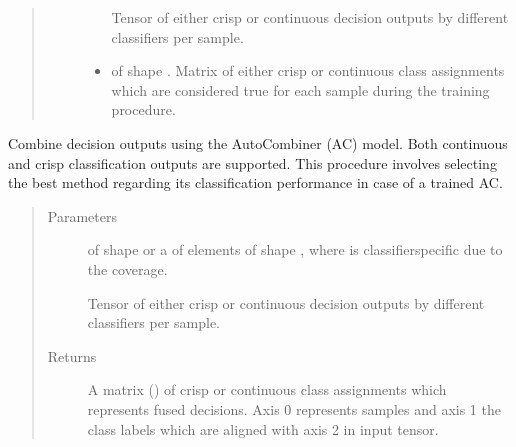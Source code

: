 \documentclass[letterpaper,10pt,english]{sphinxmanual}
\begin{document}
\begin{fulllineitems}
\begin{fulllineitems}
\begin{quote}
\begin{description}
\begin{itemize}
\sphinxAtStartPar
Tensor of either crisp or continuous decision outputs by different classifiers per sample.


\item {} 
\sphinxAtStartPar
{} \textendash{}  of shape .
Matrix of either crisp or continuous class assignments which are considered true for each sample during
the training procedure.

\end{itemize}

\end{description}\end{quote}

\end{fulllineitems}


\begin{fulllineitems}
\label{\detokenize{pusion.auto.auto_combiner:pusion.auto.auto_combiner.AutoCombiner.combine}}
\sphinxAtStartPar
Combine decision outputs using the AutoCombiner (AC) model. Both continuous and crisp classification outputs are
supported. This procedure involves selecting the best method regarding its classification performance in case
of a trained AC.
\begin{quote}\begin{description}
\item[{Parameters}] \leavevmode
\sphinxAtStartPar
{} \textendash{} 
\sphinxAtStartPar
{} of shape  or a  of
 elements of shape , where  is classifier\sphinxhyphen{}specific
due to the coverage.

\sphinxAtStartPar
Tensor of either crisp or continuous decision outputs by different classifiers per sample.


\item[{Returns}] \leavevmode
\sphinxAtStartPar
A matrix () of crisp or continuous class assignments which represents fused decisions.
Axis 0 represents samples and axis 1 the class labels which are aligned with axis 2 in
 input tensor.


\end{description}
\end{quote}
\end{fulllineitems}
\end{fulllineitems}
\end{document}
